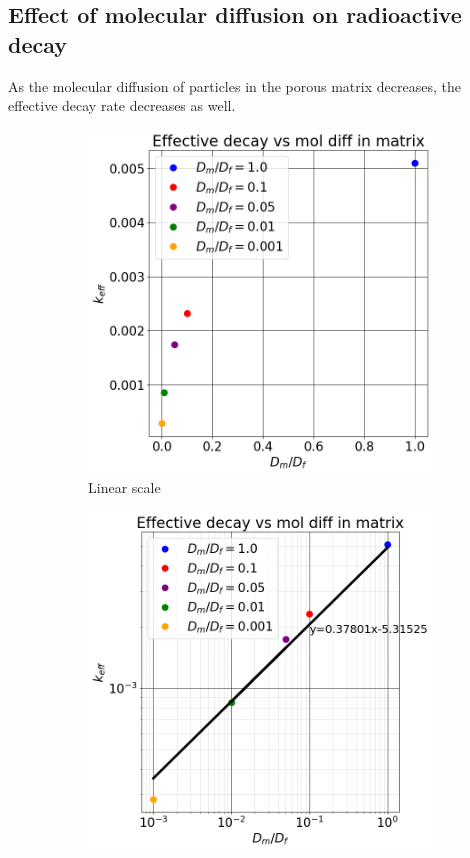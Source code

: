 \documentclass{article}
\begin{document}
\subsection{Effect of molecular diffusion on radioactive decay}
As the molecular diffusion of particles in the porous matrix decreases, the effective decay rate decreases as well.
\begin{figure}[htbp]
    \centering
    \begin{subfigure}[b]{0.48\textwidth}
        \centering
        \includegraphics[width=\textwidth]{images/kEffVsDfDmRatio.png}
        \caption{Linear scale}
    \end{subfigure}
    \hfill
    \begin{subfigure}[b]{0.48\textwidth}
        \centering
        \includegraphics[width=\textwidth]{images/kEffVsDfDmRatioLogLog.png}

\end{subfigure}
\end{figure}
\end{document}
